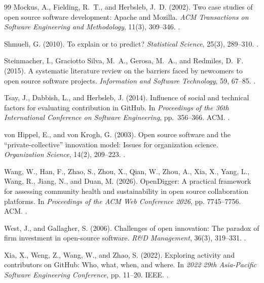 \begin{thebibliography}{99}
Mockus, A., Fielding, R.~T., and Herbsleb, J.~D. (2002).
Two case studies of open source software development: Apache and Mozilla.
\emph{ACM Transactions on Software Engineering and Methodology}, 11(3), 309--346.
.

Shmueli, G. (2010).
To explain or to predict?
\emph{Statistical Science}, 25(3), 289--310.
.

Steinmacher, I., Graciotto Silva, M.~A., Gerosa, M.~A., and Redmiles, D.~F. (2015).
A systematic literature review on the barriers faced by newcomers to open source software projects.
\emph{Information and Software Technology}, 59, 67--85.
.

Tsay, J., Dabbish, L., and Herbsleb, J. (2014).
Influence of social and technical factors for evaluating contribution in GitHub.
In \emph{Proceedings of the 36th International Conference on Software Engineering}, pp.~356--366. ACM.
.

von Hippel, E., and von Krogh, G. (2003).
Open source software and the “private-collective” innovation model: Issues for organization science.
\emph{Organization Science}, 14(2), 209--223.
.

Wang, W., Han, F., Zhao, S., Zhou, X., Qian, W., Zhou, A., Xia, X., Yang, L., Wang, R., Jiang, N., and Duan, M. (2026).
OpenDigger: A practical framework for assessing community health and sustainability in open source collaboration platforms.
In \emph{Proceedings of the ACM Web Conference 2026}, pp. 7745--7756. ACM.
.

West, J., and Gallagher, S. (2006).
Challenges of open innovation: The paradox of firm investment in open-source software.
\emph{R\&D Management}, 36(3), 319--331.
.

Xia, X., Weng, Z., Wang, W., and Zhao, S. (2022).
Exploring activity and contributors on GitHub: Who, what, when, and where.
In \emph{2022 29th Asia-Pacific Software Engineering Conference}, pp. 11--20. IEEE.
.


\end{thebibliography}

